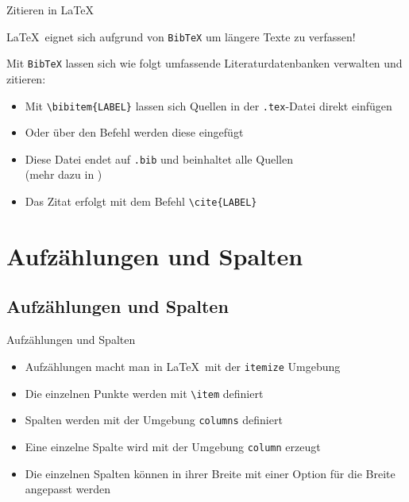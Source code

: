 \documentclass[mathserif,serif,german]{beamer}
\begin{document}
\begin{frame}[fragile]{Zitieren in \LaTeX}
	
	
	\LaTeX~eignet sich aufgrund von \verb|BibTeX| um längere Texte zu verfassen!
	\vspace{12pt}
	
	Mit \verb|BibTeX| lassen sich wie folgt umfassende Literaturdatenbanken verwalten und zitieren:
	
	\begin{itemize}
		\item Mit \verb|\bibitem{LABEL}| lassen sich Quellen in der \verb|.tex|-Datei direkt einfügen
		\item Oder über den Befehl \verb|| werden diese eingefügt
		\item Diese Datei endet auf \verb|.bib| und beinhaltet alle Quellen\\(mehr dazu in \cite{Latex_Zitat})
		\item Das Zitat erfolgt mit dem Befehl \verb|\cite{LABEL}|
	\end{itemize}
	
\end{frame}	

\section{Aufzählungen und Spalten}
\subsection{Aufzählungen und Spalten}


\begin{frame}[fragile]{Aufzählungen und Spalten}
	
	\begin{itemize}
		\item Aufzählungen macht man in \LaTeX~mit der \verb|itemize| Umgebung
		\item Die einzelnen Punkte werden mit \verb|\item| definiert
		\item Spalten werden mit der Umgebung \verb|columns| definiert
		\item Eine einzelne Spalte wird mit der Umgebung \verb|column| erzeugt
		\item Die einzelnen Spalten können in ihrer Breite mit einer Option für die Breite angepasst werden
	\end{itemize}
	
\end{frame}	
\end{document}
